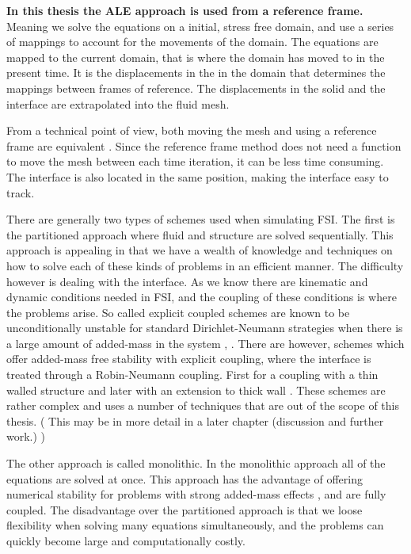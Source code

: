 \textbf{In this thesis the ALE approach is used from a reference frame.}
Meaning we solve the equations on a initial, stress free domain, and use a series of mappings to account for the movements of the domain. The equations are mapped to the current domain, that is where the domain has moved to in the present time. It is the displacements in the in the domain that determines the mappings between frames of reference. The displacements in the solid and the interface are extrapolated into the fluid mesh. \newline

From a technical point of view, both moving the mesh and using a reference frame are equivalent \cite{Richter2016}. Since the reference frame method does not need a function to move the mesh between each time iteration, it can be less time consuming. The interface is also located in the same position, making the interface easy to track. \newline

There are generally two types of schemes used when simulating FSI. The first is the partitioned approach where fluid and structure are solved sequentially.  This approach is appealing in that we have a wealth of knowledge and techniques on how to solve each of these kinds of problems in an efficient manner. The difficulty however is dealing with the interface. As we know there are kinematic and dynamic conditions needed in FSI, and the coupling of these conditions is where the problems arise. So called explicit coupled schemes are known to be unconditionally unstable for standard Dirichlet-Neumann strategies when there is a large amount of added-mass in the system \cite{Fernandez2015}, \cite{VanBrummelen2009}. There are however, schemes which offer added-mass free stability with explicit coupling, where the interface is treated through a Robin-Neumann coupling. First for a coupling with a thin walled structure \cite{Fernandez2013} and later with an extension to thick wall \cite{Fernandez2015}. These schemes are rather complex and uses a number of techniques that are out of the scope of this thesis. ( This may be in more detail in a later chapter (discussion and further work.) ) \newline

The other approach is called monolithic. In the monolithic approach all of the equations are solved at once. This approach has the advantage of offering numerical stability for problems with strong added-mass effects \cite{Liu2014}, and are fully coupled. The disadvantage over the partitioned approach is that we loose flexibility when solving many equations simultaneously, and the problems can quickly become large and computationally costly. \newline

